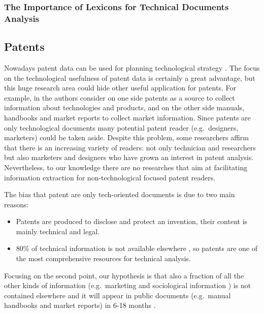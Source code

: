 \documentclass[]{book}
\providecommand{\tightlist}{%
  \setlength{\itemsep}{0pt}\setlength{\parskip}{0pt}}
\begin{document}
\subsubsection{The Importance of Lexicons for Technical Documents
Analysis}\label{sotadocumentsunderstandlexicons}

\subsection{Patents}\label{sotadocumentspatents}

Nowadays patent data can be used for planning technological strategy
\citep{ernst2003patent}. The focus on the technological usefulness of
patent data is certainly a great advantage, but this huge research area
could hide other useful application for patents. For example, in
\citep{jin2015technology} the authors consider on one side patents as a
source to collect information about technologies and products, and on
the other side manuals, handbooks and market reports to collect market
information. Since patents are only technological documents many
potential patent reader (e.g.~designers, marketers) could be taken
aside. Despite this problem, some researchers \citep{bonino2010review}
affirm that there is an increasing variety of readers: not only
technician and researchers but also marketers and designers who have
grown an interest in patent analysis. Nevertheless, to our knowledge
there are no researches that aim at facilitating information extraction
for non-technological focused patent readers.

The bias that patent are only tech-oriented documents is due to two main
reasons:

\begin{itemize}
\tightlist
\item
  Patents are produced to disclose and protect an invention, their
  content is mainly technical and legal.
\item
  80\% of technical information is not available elsewhere
  \citep{terragno1979}, so patents are one of the most comprehensive
  resources for technical analysis.
\end{itemize}

Focusing on the second point, our hypothesis is that also a fraction of
all the other kinds of information (e.g.~marketing and sociological
information ) is not contained elsewhere and it will appear in public
documents (e.g.~manual handbooks and market reports) in 6-18 months
\citep{golzio2012}.
\end{document}

